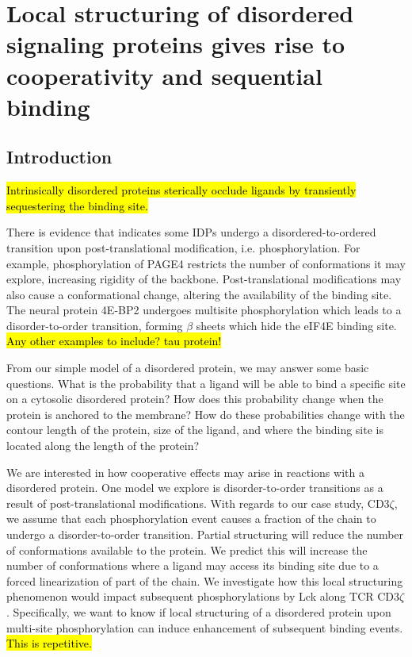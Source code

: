 \documentclass[../../AdvancementSummary.tex]{subfiles}
\begin{document}
\section{Local structuring of disordered signaling proteins gives rise to cooperativity and sequential binding}
\label{sec:LocalStruct}


\subsection{Introduction}

\hl{Intrinsically disordered proteins sterically occlude ligands by transiently sequestering the binding site.} 

There is evidence that indicates some IDPs undergo a disordered-to-ordered transition upon post-translational modification, i.e. phosphorylation. For example, phosphorylation of PAGE4 restricts the number of conformations it may explore, increasing rigidity of the backbone.\cite{He2015} Post-translational modifications may also cause a conformational change, altering the availability of the binding site.  The neural protein 4E-BP2 undergoes multisite phosphorylation which leads to a disorder-to-order transition, forming $\beta$ sheets which hide the eIF4E binding site. \cite{Bah2015} \hl{Any other examples to include? tau protein!}

From our simple model of a disordered protein, we may answer some basic questions.  What is the probability that a ligand will be able to bind a specific site on a cytosolic disordered protein?  How does this probability change when the protein is anchored to the membrane?  How do these probabilities change with the contour length of the protein, size of the ligand, and where the binding site is located along the length of the protein?

We are interested in how cooperative effects may arise in reactions with a disordered protein. One model we explore is disorder-to-order transitions as a result of post-translational modifications. With regards to our case study, CD3$\zeta$, we assume that each phosphorylation event causes a fraction of the chain to undergo a disorder-to-order transition. Partial structuring will reduce the number of conformations available to the protein. We predict this will increase the number of conformations where a ligand may access its binding site due to a forced linearization of part of the chain. We investigate how this local structuring phenomenon would impact subsequent phosphorylations by Lck along TCR CD3$\zeta$. Specifically, we want to know if local structuring of a disordered protein upon multi-site phosphorylation can induce enhancement of subsequent binding events. \hl{This is repetitive.}
\end{document}
